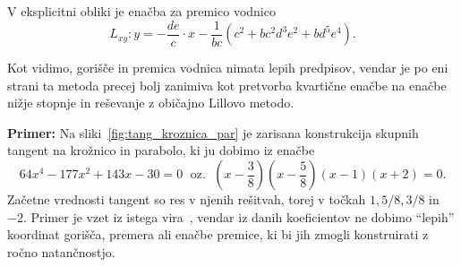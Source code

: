 V eksplicitni obliki je enačba za premico vodnico
$$ L_{xy}: y = -\frac{de}{c} \cdot x - \frac{1}{bc} (c^2 + bc^2d^3e^2 + bd^5e^4). $$

Kot vidimo, gorišče in premica vodnica nimata lepih predpisov, vendar je po eni strani ta metoda precej bolj zanimiva kot pretvorba kvartične enačbe na enačbe nižje stopnje in reševanje z običajno Lillovo metodo.

\textbf{Primer:} Na sliki~\ref{fig:tang_kroznica_par} je zarisana konstrukcija skupnih tangent na krožnico in parabolo, ki ju dobimo iz enačbe
$$ 64x^4 - 177x^2 + 143x - 30 = 0 \; \text{ oz. } \; \left(x - \frac{3}{8}\right) \left(x - \frac{5}{8}\right) (x-1) (x+2) = 0.$$
Začetne vrednosti tangent so res v njenih rešitvah, torej v točkah $1, 5/8, 3/8$ in $-2$. Primer je vzet iz istega vira~\cite[str.\ 25]{edwards2001}, vendar iz danih koeficientov ne dobimo ``lepih'' koordinat gorišča, premera ali enačbe premice, ki bi jih zmogli konstruirati z ročno natančnostjo.

